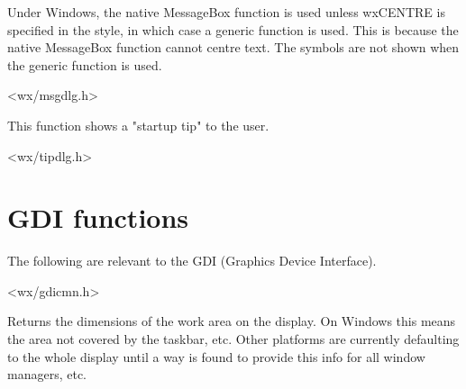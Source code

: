 Under Windows, the native MessageBox function is used unless wxCENTRE
is specified in the style, in which case a generic function is used.
This is because the native MessageBox function cannot centre text.
The symbols are not shown when the generic function is used.


<wx/msgdlg.h>

\label{wxshowtip}


This function shows a "startup tip" to the user.







<wx/tipdlg.h>

\section{GDI functions}\label{gdifunctions}

The following are relevant to the GDI (Graphics Device Interface).


<wx/gdicmn.h>




Returns the dimensions of the work area on the display.  On Windows
this means the area not covered by the taskbar, etc.  Other platforms
are currently defaulting to the whole display until a way is found to
provide this info for all window managers, etc.

